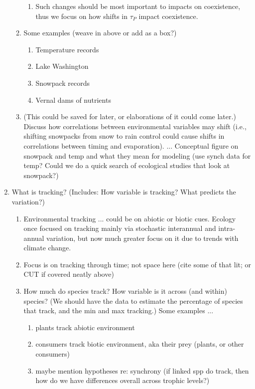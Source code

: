 \documentclass[11pt,letterpaper]{article}
\begin{document}
\begin{enumerate}
\begin{enumerate}
\begin{enumerate}
\item Such changes should be most important to impacts on coexistence, thus we focus on how shifts in $\tau_{P}$ impact coexistence.
\end{enumerate}
\item Some examples (weave in above or add as a box?)
\begin{enumerate}
\item Temperature records
\item Lake Washington 
\item Snowpack records 
\item Vernal dams of nutrients
\end{enumerate}
\item (This could be saved for later, or elaborations of it could come later.) Discuss how correlations between environmental variables may shift (i.e., shifting snowpacks from snow to rain control could cause shifts in correlations between timing and evaporation). ... Conceptual figure on snowpack and temp and what they mean for modeling (use synch data for temp? Could we do a quick search of ecological studies that look at snowpack?) 
\end{enumerate}
\item What is tracking? (Includes: How variable is tracking? What predicts the variation?)
\begin{enumerate}
\item Environmental tracking ... could be on abiotic or biotic cues. Ecology once focused on tracking mainly via stochastic interannual and intra-annual variation, but now much greater focus on it due to trends with climate change. 
\item Focus is on tracking through time; not space here (cite some of that lit; or CUT if covered neatly above)
\item How much do species track? How variable is it across (and within) species? (We should have the data to estimate the
percentage of species that track, and the min and max tracking.) Some examples ...
\begin{enumerate}
\item plants track abiotic environment 
\item consumers track biotic environment, aka their prey (plants, or other consumers)
\item maybe mention hypotheses re: synchrony (if linked spp do track, then how do we have differences overall across trophic levels?)
\end{enumerate}
\end{enumerate}

\end{enumerate}
\end{document}
